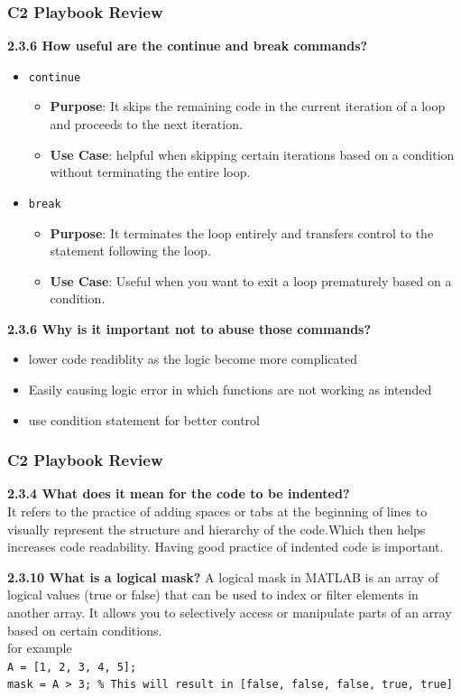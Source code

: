 \documentclass[
	11pt, %
]{beamer}
\begin{document}
\begin{frame}
    \frametitle{C2 Playbook Review}
    \textbf{2.3.6 How useful are the continue and break commands?}
    \begin{itemize}
        \item \texttt{continue}
        \begin{itemize}
            \item \textbf{Purpose}: It skips the remaining code in the current iteration of a loop and proceeds to the next iteration.
            \item \textbf{Use Case}: helpful when skipping certain iterations based on a condition without terminating the entire loop. 
        \end{itemize}
        \item \texttt{break}
        \begin{itemize}
            \item \textbf{Purpose}: It terminates the loop entirely and transfers control to the statement following the loop.
            \item \textbf{Use Case}: Useful when you want to exit a loop prematurely based on a condition.
        \end{itemize}
       \end{itemize}
    
    \textbf{2.3.6 Why is it important not to abuse those commands?}
    
    \begin{itemize}
        \item lower code readiblity as the logic become more complicated
        \item Easily causing logic error in which functions are not working as intended
        \item use condition statement for better control
    \end{itemize}

\end{frame}



\begin{frame}
    \frametitle{C2 Playbook Review}
    \textbf{2.3.4 What does it mean for the code to be indented?}\\
    It refers to the practice of adding spaces or tabs at the beginning of lines to visually represent the structure and hierarchy of the code.Which then helps increases code readability.
    Having good practice of indented code is important.
    
    \bigskip

    \textbf{2.3.10 What is a logical mask?}
    A logical mask in MATLAB is an array of logical values (true or false) that can be used to index or filter elements in another array. It allows you to selectively access or manipulate parts of an array based on certain conditions. 
    \\ for example
    \\\texttt{A = [1, 2, 3, 4, 5];}
    \\\texttt{mask = A > 3; \% This will result in [false, false, false, true, true]}

\end{frame}
\end{document}
